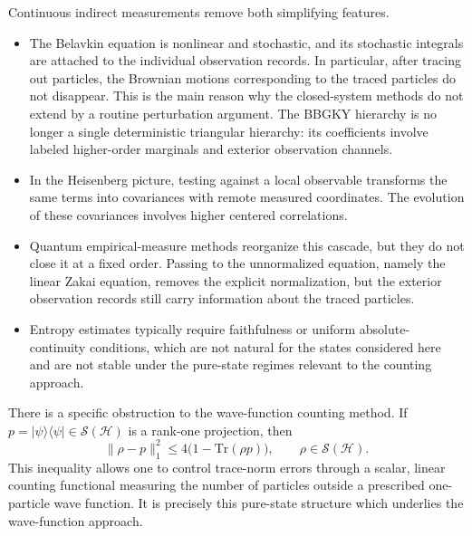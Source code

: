 \documentclass[10pt,a4paper,reqno]{amsart}
\numberwithin{equation}{section}
\theoremstyle{plain}
\theoremstyle{definition}
\theoremstyle{remark}
\newcommand{\Tr}{\mathrm{Tr}}
\newcommand{\cS}{\mathcal S}
\newcommand{\HH}{\mathcal H}
\newcommand{\1}{\mathbf 1}
\begin{document}
Continuous indirect measurements remove both simplifying features.
\begin{itemize}
\item The Belavkin equation is nonlinear and stochastic, and its stochastic
integrals are attached to the individual observation records.  In particular,
after tracing out particles, the Brownian motions corresponding to the traced
particles do not disappear.  This is the main reason why the closed-system
methods do not extend by a routine perturbation argument.  The BBGKY hierarchy
is no longer a single deterministic triangular hierarchy: its coefficients
involve labeled higher-order marginals and exterior observation channels.

\item In the Heisenberg picture, testing against a local observable transforms
the same terms into covariances with remote measured coordinates.  The
evolution of these covariances involves higher centered correlations.

\item Quantum empirical-measure methods reorganize this cascade, but they do
not close it at a fixed order.  Passing to the unnormalized equation, namely
the linear Zakai equation, removes the explicit normalization, but the exterior
observation records still carry information about the traced particles.

\item Entropy estimates typically require faithfulness or uniform absolute-continuity
conditions, which are not natural for the states considered here
and are not stable under the pure-state regimes relevant to the counting
approach.
\end{itemize}

There is a specific obstruction to the wave-function counting method.  If
\(
  p=|\psi\rangle\langle\psi|\in\cS(\HH)
\)
is a rank-one projection,  then
\begin{equation}
  \|\rho-p\|_1^2
  \le
  4\big(1-\Tr(\rho p)\big),
  \qquad \rho\in\cS(\HH).
  \label{eq:pure-state-trace-bound}
\end{equation}
This inequality allows one to control trace-norm errors through a scalar,
linear counting functional measuring the number of particles outside a
prescribed one-particle wave function.  It is precisely this pure-state
structure which underlies the wave-function approach.
\end{document}
